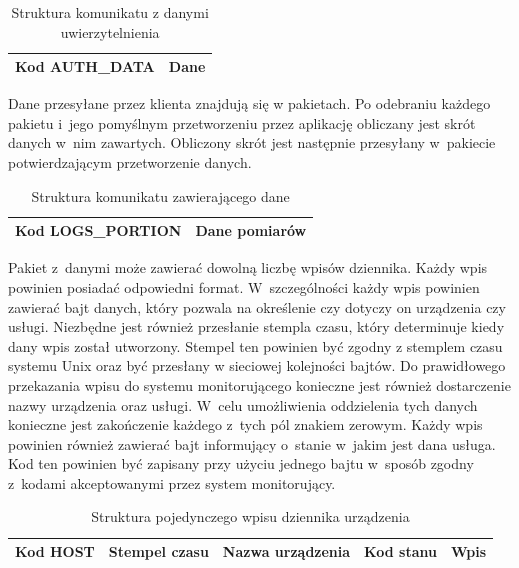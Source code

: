 \begin{table}[H]
\centering
\caption{Struktura komunikatu z danymi uwierzytelnienia }
\begin{tabular}{|p{3cm}|p{6cm}|}
\hline
Kod AUTH\_DATA & Dane \\
\hline
\end{tabular}
\end{table}

Dane przesyłane przez klienta znajdują się w pakietach. Po odebraniu
każdego pakietu i~jego pomyślnym przetworzeniu przez aplikację
obliczany jest skrót danych w~nim zawartych. Obliczony skrót jest
następnie przesyłany w~pakiecie potwierdzającym przetworzenie danych.

\begin{table}[H]
\centering
\caption{Struktura komunikatu zawierającego dane }
\begin{tabular}{|p{3cm}|p{6cm}|}
\hline
\raggedright{Kod LOGS\_PORTION} & Dane pomiarów  \\
\hline
\end{tabular}
\end{table}

Pakiet z~danymi może zawierać dowolną liczbę wpisów dziennika. Każdy
wpis powinien posiadać odpowiedni format. W~szczególności każdy wpis
powinien zawierać bajt danych, który pozwala na określenie czy dotyczy
on urządzenia czy usługi. Niezbędne jest również przesłanie stempla
czasu, który determinuje kiedy dany wpis został utworzony. Stempel ten
powinien być zgodny z stemplem czasu systemu Unix oraz być przesłany w
sieciowej kolejności bajtów. Do prawidłowego przekazania wpisu do
systemu monitorującego konieczne jest również dostarczenie nazwy
urządzenia oraz usługi. W~celu umożliwienia oddzielenia tych danych
konieczne jest zakończenie każdego z~tych pól znakiem zerowym. Każdy
wpis powinien również zawierać bajt informujący o~stanie w~jakim jest
dana usługa. Kod ten powinien być zapisany przy użyciu jednego bajtu
w~sposób zgodny z~kodami akceptowanymi przez system monitorujący.

\begin{table}[H]
\centering
\caption{Struktura pojedynczego wpisu dziennika urządzenia }
\begin{tabular}{|p{2cm}|p{3cm}|p{4cm}|p{2cm}|p{2cm}|}
\hline
Kod HOST & Stempel czasu & Nazwa urządzenia & Kod stanu & Wpis  \\
\hline
\end{tabular}
\end{table}

